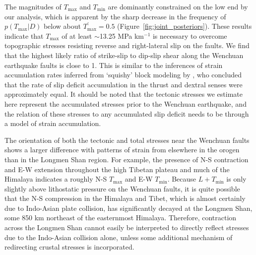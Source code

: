 \documentclass[draft,jgrga]{AGUTeX}
\begin{document}
\begin{article}

The magnitudes of $T_{\mathrm{max}}$ and $T_{\mathrm{min}}$ are
dominantly constrained on the low end by our analysis, which is apparent
by the sharp decrease in the frequency of $p(T_{\mathrm{max}}|D)$ below
about $T^\prime_{\mathrm{max}} = 0.5$ (Figure~\ref{fig:joint_posteriors}). 
These results indicate that $T_{\mathrm{max}}$ of at
least $\sim$13.25 MPa km$^{-1}$ is necessary to overcome
topographic stresses resisting reverse and right-lateral slip on the
faults. We find that the highest likely ratio of strike-slip to dip-slip
shear along the Wenchuan earthquake faults is close to 1. This is
similar to the inferences of strain accumulation rates inferred from
`squishy' block modeling by \citet{loveless2011}, who
concluded that the rate of slip deficit accumulation in the thrust and
dextral senses were approximately equal. It should be noted that the
tectonic stresses we estimate here represent the accumulated stresses
prior to the Wenchuan earthquake, and the relation of these stresses to any
accumulated slip deficit needs to be through a model of strain
accumulation.

The orientation of both the tectonic and total stresses near the
Wenchuan faults shows a larger difference with patterns of strain from
elsewhere in the orogen than in the Longmen Shan region. For example, the
presence of N-S contraction and E-W extension throughout the high Tibetan
plateau and much of the Himalaya \citep[e.g.,][]{armijo1986, molnar1988,
taylor2003} indicates a roughly N-S $T_{\mathrm{max}}$ and E-W
$T_{\mathrm{min}}$. Because $ L + T_{\mathrm{min}}$ is only slightly above
lithostatic pressure on the Wenchuan faults, it is quite possible that the N-S
compression in the Himalaya and Tibet, which is almost certainly due to
Indo-Asian plate collision, has significantly decayed at the Longmen Shan, some
850 km northeast of the easternmost Himalaya. Therefore, contraction across the
Longmen Shan cannot easily be interpreted to directly reflect stresses due to
the Indo-Asian collision alone, unless some additional mechanism of redirecting
crustal stresses is incorporated.


\end{article}
\end{document}
